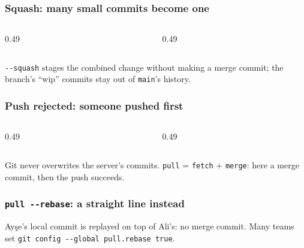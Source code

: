 \documentclass[aspectratio=169,10pt,compress]{beamer}
\begin{document}
\begin{frame}[t,fragile] \frametitle{Squash: many small commits become one}
  \begin{columns}[T]
    \begin{column}{0.49\textwidth}
    \end{column}
    \begin{column}{0.49\textwidth}
    \end{column}
  \end{columns}

  \vspace{0.1em}
  \small
  \texttt{-{}-squash} stages the combined change without making a merge commit; the branch's ``wip'' commits stay out of \texttt{main}'s history.
\end{frame}





\begin{frame}[t,fragile] \frametitle{Push rejected: someone pushed first}
  \begin{columns}[T]
    \begin{column}{0.49\textwidth}
    \end{column}
    \begin{column}{0.49\textwidth}
    \end{column}
  \end{columns}

  \vspace{0.1em}
  \small
  Git never overwrites the server's commits. \texttt{pull} = \texttt{fetch} + \texttt{merge}: here a merge commit, then the push succeeds.
\end{frame}




\begin{frame}[t,fragile] \frametitle{\texttt{pull -{}-rebase}: a straight line instead}

  \vspace{0.1em}
  \small
  Ayşe's local commit is replayed on top of Ali's: no merge commit. Many teams set \texttt{git config -{}-global pull.rebase true}.
\end{frame}
\end{document}
